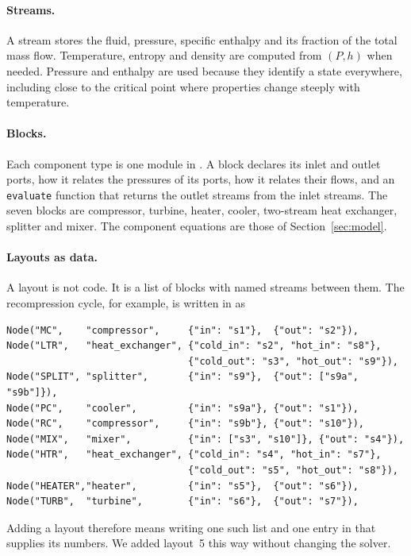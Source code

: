 \paragraph{Streams.} A stream stores the fluid, pressure, specific enthalpy and its fraction of the total mass flow. Temperature, entropy and density are computed from $(P, h)$ when needed. Pressure and enthalpy are used because they identify a state everywhere, including close to the critical point where properties change steeply with temperature.

\paragraph{Blocks.} Each component type is one module in . A block declares its inlet and outlet ports, how it relates the pressures of its ports, how it relates their flows, and an \texttt{evaluate} function that returns the outlet streams from the inlet streams. The seven blocks are compressor, turbine, heater, cooler, two-stream heat exchanger, splitter and mixer. The component equations are those of Section~\ref{sec:model}.

\paragraph{Layouts as data.} A layout is not code. It is a list of blocks with named streams between them. The recompression cycle, for example, is written in  as
{\small
\begin{verbatim}
Node("MC",    "compressor",     {"in": "s1"},  {"out": "s2"}),
Node("LTR",   "heat_exchanger", {"cold_in": "s2", "hot_in": "s8"},
                                {"cold_out": "s3", "hot_out": "s9"}),
Node("SPLIT", "splitter",       {"in": "s9"},  {"out": ["s9a", "s9b"]}),
Node("PC",    "cooler",         {"in": "s9a"}, {"out": "s1"}),
Node("RC",    "compressor",     {"in": "s9b"}, {"out": "s10"}),
Node("MIX",   "mixer",          {"in": ["s3", "s10"]}, {"out": "s4"}),
Node("HTR",   "heat_exchanger", {"cold_in": "s4", "hot_in": "s7"},
                                {"cold_out": "s5", "hot_out": "s8"}),
Node("HEATER","heater",         {"in": "s5"},  {"out": "s6"}),
Node("TURB",  "turbine",        {"in": "s6"},  {"out": "s7"}),
\end{verbatim}}
\noindent Adding a layout therefore means writing one such list and one entry in  that supplies its numbers. We added layout~5 this way without changing the solver.

